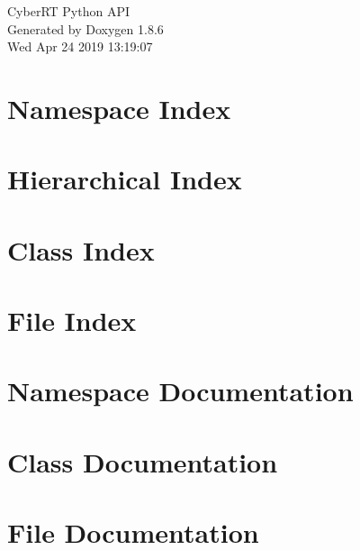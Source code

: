 \documentclass[twoside]{book}
\newcommand{\clearemptydoublepage}{%
  \newpage{\pagestyle{empty}\cleardoublepage}%
}
\begin{document}
\hypersetup{pageanchor=false}
\begin{titlepage}
\vspace*{7cm}
\begin{center}%
{\Large Cyber\-R\-T Python A\-P\-I }\\
\vspace*{1cm}
{\large Generated by Doxygen 1.8.6}\\
\vspace*{0.5cm}
{\small Wed Apr 24 2019 13:19:07}\\
\end{center}
\end{titlepage}
\clearemptydoublepage
\tableofcontents
\clearemptydoublepage
{}
\hypersetup{pageanchor=true}

\chapter{Namespace Index}

\chapter{Hierarchical Index}

\chapter{Class Index}

\chapter{File Index}

\chapter{Namespace Documentation}






\chapter{Class Documentation}











\chapter{File Documentation}






\newpage
{}
{}
\printindex
\end{document}
